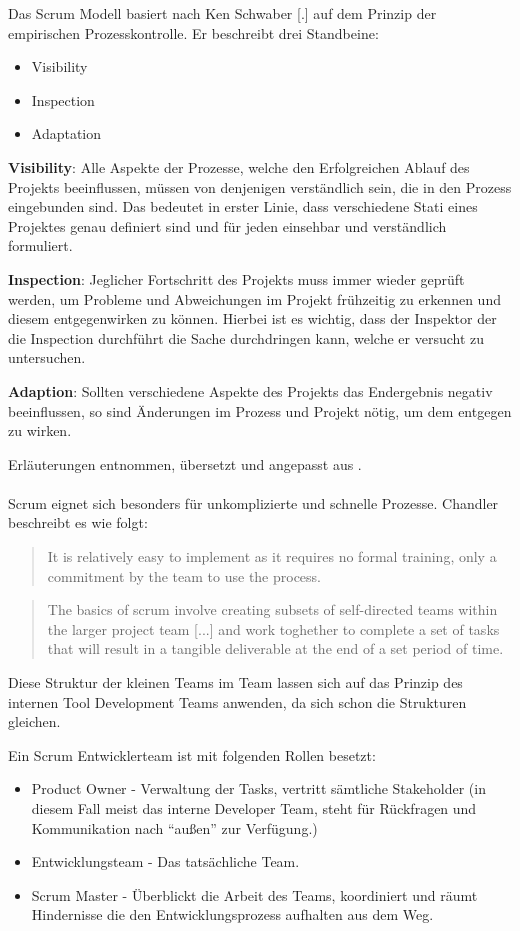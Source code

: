 \documentclass[pagesize, paper=a4, fontsize=12pt, titlepage=true, headings=small, headnosepline, abstractoff, liststotoc, nochapterprefix, plainheadsepline, twoside]{scrreprt}
\begin{document}
Das Scrum Modell basiert nach Ken Schwaber [.] auf dem Prinzip der empirischen Prozesskontrolle. Er beschreibt drei Standbeine:
\begin{itemize}
\item Visibility
\item Inspection
\item Adaptation
\end{itemize}

\textbf{Visibility}: Alle Aspekte der Prozesse, welche den Erfolgreichen Ablauf des Projekts beeinflussen, müssen von denjenigen verständlich sein, die in den Prozess eingebunden sind. Das bedeutet in erster Linie, dass verschiedene Stati eines Projektes genau definiert sind und für jeden einsehbar und verständlich formuliert. 

\textbf{Inspection}: Jeglicher Fortschritt des Projekts muss immer wieder geprüft werden, um Probleme und Abweichungen im Projekt frühzeitig zu erkennen und diesem entgegenwirken zu können. Hierbei ist es wichtig, dass der Inspektor der die Inspection durchführt die Sache durchdringen kann, welche er versucht zu untersuchen.

\textbf{Adaption}: Sollten verschiedene Aspekte des Projekts das Endergebnis negativ beeinflussen, so sind Änderungen im Prozess und Projekt nötig, um dem entgegen zu wirken.

Erläuterungen entnommen, übersetzt und angepasst aus .
\\
\\
Scrum eignet sich besonders für unkomplizierte und schnelle Prozesse. Chandler beschreibt es wie folgt:
\begin{quote}
\glqq It is relatively easy to implement as it requires no formal training, only a commitment by the team to use the process.\grqq{}
\cite[S. 45]{Chandler2006}
\end{quote}
\begin{quote}
\glqq The basics of scrum involve creating subsets of self-directed teams within the larger project team [...] and work toghether to complete a set of tasks that will result in a tangible deliverable at the end of a set period of time.\grqq{}
\cite[S. 45]{Chandler2006}
\end{quote}
Diese Struktur der kleinen Teams im Team lassen sich auf das Prinzip des internen Tool Development Teams anwenden, da sich schon die Strukturen gleichen.

Ein Scrum Entwicklerteam ist mit folgenden Rollen besetzt:
\begin{itemize}
\item Product Owner - Verwaltung der Tasks, vertritt sämtliche Stakeholder (in diesem Fall meist das interne Developer Team, steht für Rückfragen und Kommunikation nach “außen” zur Verfügung.)
\item Entwicklungsteam - Das tatsächliche Team.
\item Scrum Master - Überblickt die Arbeit des Teams, koordiniert und räumt Hindernisse die den Entwicklungsprozess aufhalten aus dem Weg.
\end{itemize}
\end{document}

